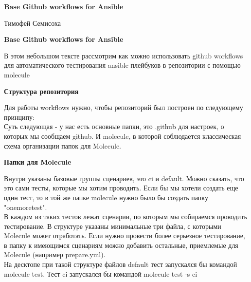 \documentclass[12pt]{article}
\begin{document}
\begin{titlepage}
    \centering
    \vspace*{\fill}
    
    {\Huge\bfseries Base Github workflows for Ansible}
    
    \vspace{0.5cm}
    
    {\Large Тимофей Семисоха}
    
    \vspace*{\fill}
\end{titlepage}

\newpage
{}
\setcounter{page}{2}


{\Large\bfseries Base Github workflows for Ansible} \par
В этом небольшом тексте рассмотрим как можно использовать github workflows для автоматического тестирования ansible плейбуков в репозитории с помощью molecule\par\vspace{10pt}
{\Large\bfseries Структура репозитория} \par
Для работы workflows нужно, чтобы репозиторий был построен по следующему принципу:\\
Суть следующая - у нас есть основные папки, это .github для настроек, о которых мы сообщаем github. И molecule, в которой соблюдается классическая схема организации папок для Molecule.\par\vspace{10pt}
{\Large\bfseries Папки для Molecule}\par
Внутри указаны базовые группы сценариев, это ci и default. Можно сказать, что это сами тесты, которые мы хотим проводить. Если бы мы хотели создать еще один тест, то в той же папке molecule нужно было бы создать папку "onemoretest".\\
В каждом из таких тестов лежат сценарии, по которым мы собираемся проводить тестирование. В структуре указаны минимальные три файла, с которыми Molecule может отработать. Если нужно провести более серьезное тестирование, в папку к имеющимся сценариям можно добавить остальные, приемлемые для Molecule (например prepare.yml).\\
На десктопе при такой структуре файлов default тест запускался бы командой molecule test. Тест ci запускался бы командой molecule test -s ci
\end{document}
